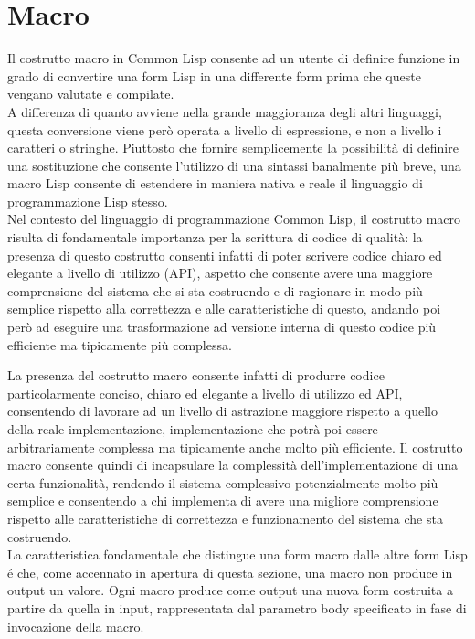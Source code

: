 \section{Macro}

Il costrutto macro in Common Lisp consente ad un utente di definire funzione
in grado di convertire una form Lisp in una differente form prima che queste
vengano valutate e compilate.\\

A differenza di quanto avviene nella grande maggioranza degli altri linguaggi,
questa conversione viene però operata a livello di espressione, e non a
livello i caratteri o stringhe. Piuttosto che fornire semplicemente la
possibilità di definire una sostituzione che consente l’utilizzo di una
sintassi banalmente più breve, una macro Lisp consente di estendere in maniera
nativa e reale il linguaggio di programmazione Lisp stesso.\\

Nel contesto del linguaggio di programmazione Common Lisp, il costrutto macro
risulta di fondamentale importanza per la scrittura di codice di qualità: la
presenza di questo costrutto consenti infatti di poter scrivere codice chiaro
ed elegante a livello di utilizzo (API), aspetto che consente avere una
maggiore comprensione del sistema che si sta costruendo e di ragionare in modo
più semplice rispetto alla correttezza e alle caratteristiche di questo,
andando poi però ad eseguire una trasformazione ad versione interna di questo
codice più efficiente ma tipicamente più complessa.

La presenza del costrutto macro consente infatti di produrre codice
particolarmente conciso, chiaro ed elegante a livello di utilizzo ed API,
consentendo di lavorare ad un livello di astrazione maggiore rispetto a quello
della reale implementazione, implementazione che potrà poi essere
arbitrariamente complessa ma tipicamente anche molto più efficiente. Il
costrutto macro consente quindi di incapsulare la complessità
dell’implementazione di una certa funzionalità, rendendo il sistema
complessivo potenzialmente molto più semplice e consentendo a chi implementa
di avere una migliore comprensione rispetto alle caratteristiche di
correttezza e funzionamento del sistema che sta costruendo.\\

La caratteristica fondamentale che distingue una form macro dalle altre form
Lisp é che, come accennato in apertura di questa sezione, una macro non
produce in output un valore. Ogni macro produce come output una nuova form
costruita a partire da quella in input, rappresentata dal parametro body
specificato in fase di invocazione della macro.\\

